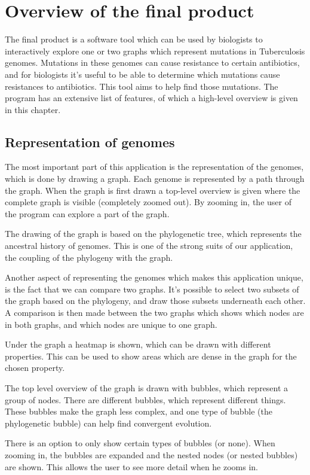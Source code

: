 \chapter{Overview of the final product}
The final product is a software tool which can be used by biologists to interactively explore one or two graphs which represent mutations in Tuberculosis genomes. Mutations in these genomes can cause resistance to certain antibiotics, and for biologists it’s useful to be able to determine which mutations cause resistances to antibiotics. This tool aims to help find those mutations. The program has an extensive list of features, of which a high-level overview is given in this chapter.

\section{Representation of genomes}
\par
The most important part of this application is the representation of the genomes, which is done by drawing a graph. Each genome is represented by a path through the graph. When the graph is first drawn a top-level overview is given where the complete graph is visible (completely zoomed out). By zooming in, the user of the program can explore a part of the graph.
\par
The drawing of the graph is based on the phylogenetic tree, which represents the ancestral history of genomes. This is one of the strong suits of our application, the coupling of the phylogeny with the graph.
\par
Another aspect of representing the genomes which makes this application unique, is the fact that we can compare two graphs. It’s possible to select two subsets of the graph based on the phylogeny, and draw those subsets underneath each other. A comparison is then made between the two graphs which shows which nodes are in both graphs, and which nodes are unique to one graph. 
\par
Under the graph a heatmap is shown, which can be drawn with different properties. This can be used to show areas which are dense in the graph for the chosen property. 
\par
The top level overview of the graph is drawn with bubbles, which represent a group of nodes. There are different bubbles, which represent different things. These bubbles make the graph less complex, and one type of bubble (the phylogenetic bubble) can help find convergent evolution. 
\par
There is an option to only show certain types of bubbles (or none). When zooming in, the bubbles are expanded and the nested nodes (or nested bubbles) are shown. This allows the user to see more detail when he zooms in. 

